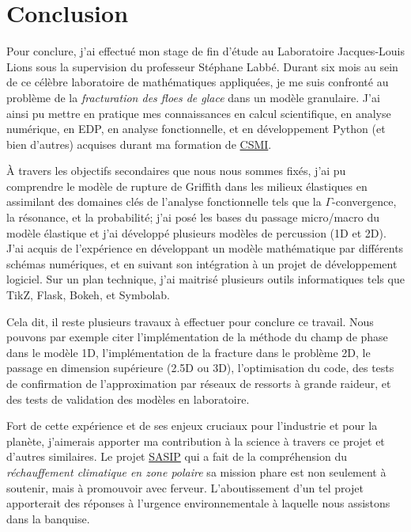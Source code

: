 
\chapter{Conclusion} %

\label{Chapter6} %



Pour conclure, j'ai effectué mon stage de fin d'étude au Laboratoire Jacques-Louis Lions sous la supervision du professeur Stéphane Labbé. Durant six mois au sein de ce célèbre laboratoire de mathématiques appliquées, je me suis confronté au problème de la \emph{fracturation des floes de glace} dans un modèle granulaire. J'ai ainsi pu mettre en pratique mes connaissances en calcul scientifique, en analyse numérique, en EDP, en analyse fonctionnelle, et en développement Python (et bien d'autres) acquises durant ma formation de \href{https://www.unistra.fr/etudes/decouvrir-nos-formations/par-facultes-ecoles-instituts/sciences-technologies/ufr-de-mathematique-et-dinformatique/ufr-de-mathematique-et-dinformatique/cursus/ME195?cHash=3aa4f04702a03e944ed933056abe17f2}{CSMI}. 

À travers les objectifs secondaires que nous nous sommes fixés, j'ai pu comprendre le modèle de rupture de Griffith dans les milieux élastiques en assimilant des domaines clés de l'analyse fonctionnelle tels que la $\Gamma$-convergence, la résonance, et la probabilité; j'ai posé les bases du passage micro/macro du modèle élastique et j'ai développé plusieurs modèles de percussion (1D et 2D). J'ai acquis de l'expérience en développant un modèle mathématique par différents schémas numériques, et en suivant son intégration à un projet de développement logiciel. Sur un plan technique, j'ai maitrisé plusieurs outils informatiques tels que TikZ, Flask, Bokeh, et Symbolab.

Cela dit, il reste plusieurs travaux à effectuer pour conclure ce travail. Nous pouvons par exemple citer l'implémentation de la méthode du champ de phase dans le modèle 1D, l'implémentation de la fracture dans le problème 2D, le passage en dimension supérieure (2.5D ou 3D), l'optimisation du code, des tests de confirmation de l'approximation par réseaux de ressorts à grande raideur, et des tests de validation des modèles en laboratoire.

Fort de cette expérience et de ses enjeux cruciaux pour l'industrie et pour la planète, j'aimerais apporter ma contribution à la science à travers ce projet et d'autres similaires. Le projet \href{https://sasip-climate.github.io/}{SASIP} qui a fait de la compréhension du \emph{réchauffement climatique en zone polaire} sa mission phare est non seulement à soutenir, mais à promouvoir avec ferveur. L'aboutissement d'un tel projet apporterait des réponses à l'urgence environnementale à laquelle nous assistons dans la banquise.

